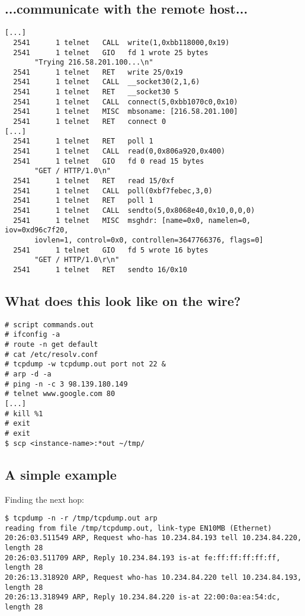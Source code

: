 \documentclass[xga]{xdvislides}
\newcommand{\smallish}{\fontsize{16}{16}\selectfont}
\begin{document}
\subsection{...communicate with the remote host...}
\smallish
\begin{verbatim}
[...]
  2541      1 telnet   CALL  write(1,0xbb118000,0x19)
  2541      1 telnet   GIO   fd 1 wrote 25 bytes
       "Trying 216.58.201.100...\n"
  2541      1 telnet   RET   write 25/0x19
  2541      1 telnet   CALL  __socket30(2,1,6)
  2541      1 telnet   RET   __socket30 5
  2541      1 telnet   CALL  connect(5,0xbb1070c0,0x10)
  2541      1 telnet   MISC  mbsoname: [216.58.201.100]
  2541      1 telnet   RET   connect 0
[...]
  2541      1 telnet   RET   poll 1 
  2541      1 telnet   CALL  read(0,0x806a920,0x400)
  2541      1 telnet   GIO   fd 0 read 15 bytes
       "GET / HTTP/1.0\n"
  2541      1 telnet   RET   read 15/0xf
  2541      1 telnet   CALL  poll(0xbf7febec,3,0)
  2541      1 telnet   RET   poll 1
  2541      1 telnet   CALL  sendto(5,0x8068e40,0x10,0,0,0)
  2541      1 telnet   MISC  msghdr: [name=0x0, namelen=0, iov=0xd96c7f20,
       iovlen=1, control=0x0, controllen=3647766376, flags=0]
  2541      1 telnet   GIO   fd 5 wrote 16 bytes
       "GET / HTTP/1.0\r\n"  
  2541      1 telnet   RET   sendto 16/0x10
\end{verbatim}
\Normalsize

\subsection{What does this look like on the wire?}
\begin{verbatim}
# script commands.out
# ifconfig -a
# route -n get default
# cat /etc/resolv.conf
# tcpdump -w tcpdump.out port not 22 &
# arp -d -a
# ping -n -c 3 98.139.180.149
# telnet www.google.com 80
[...]
# kill %1
# exit
# exit
$ scp <instance-name>:*out ~/tmp/
\end{verbatim}

\subsection{A simple example}
Finding the next hop:
\begin{verbatim}
$ tcpdump -n -r /tmp/tcpdump.out arp
reading from file /tmp/tcpdump.out, link-type EN10MB (Ethernet)
20:26:03.511549 ARP, Request who-has 10.234.84.193 tell 10.234.84.220, length 28
20:26:03.511709 ARP, Reply 10.234.84.193 is-at fe:ff:ff:ff:ff:ff, length 28
20:26:13.318920 ARP, Request who-has 10.234.84.220 tell 10.234.84.193, length 28
20:26:13.318949 ARP, Reply 10.234.84.220 is-at 22:00:0a:ea:54:dc, length 28
\end{verbatim}
\end{document}
